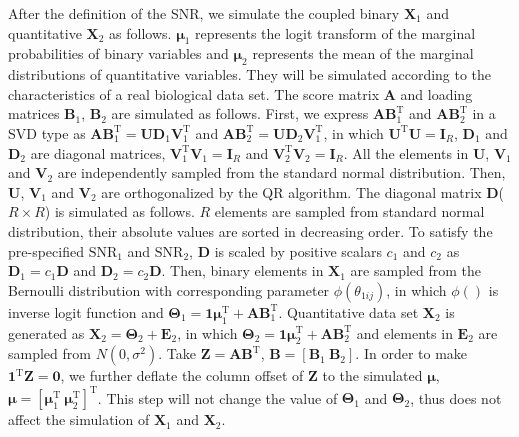 After the definition of the SNR, we simulate the coupled binary $\mathbf{X}_1$ and quantitative $\mathbf{X}_2$ as follows. $\bm{\mu}_1$ represents the logit transform of the marginal probabilities of binary variables and $\bm{\mu}_2$ represents the mean of the marginal distributions of quantitative variables. They will be simulated according to the characteristics of a real biological data set. The score matrix $\mathbf{A}$ and loading matrices $\mathbf{B}_1$, $\mathbf{B}_2$ are simulated as follows. First, we express $\mathbf{A}\mathbf{B}_1^{\text{T}}$ and $\mathbf{A}\mathbf{B}_2^{\text{T}}$ in a SVD type as $\mathbf{A}\mathbf{B}_1^{\text{T}} = \mathbf{U}\mathbf{D}_1\mathbf{V}_1^{\text{T}}$ and $\mathbf{A}\mathbf{B}_2^{\text{T}} = \mathbf{U}\mathbf{D}_2\mathbf{V}_1^{\text{T}}$, in which $\mathbf{U}^{\text{T}}\mathbf{U} = \mathbf{I}_R$, $\mathbf{D}_1$ and $\mathbf{D}_2$ are diagonal matrices, $\mathbf{V}_1^{\text{T}}\mathbf{V}_1 = \mathbf{I}_R$ and $\mathbf{V}_2^{\text{T}}\mathbf{V}_2 = \mathbf{I}_R$. All the elements in $\mathbf{U}$, $\mathbf{V}_1$ and $\mathbf{V}_2$ are independently sampled from the standard normal distribution. Then, $\mathbf{U}$, $\mathbf{V}_1$ and $\mathbf{V}_2$ are orthogonalized by the QR algorithm. The diagonal matrix $\mathbf{D}$($R\times R$) is simulated as follows. $R$ elements are sampled from standard normal distribution, their absolute values are sorted in decreasing order. To satisfy the pre-specified $\text{SNR}_1$ and $\text{SNR}_2$, $\mathbf{D}$ is scaled by positive scalars $c_1$ and $c_2$ as $\mathbf{D}_1 = c_1\mathbf{D}$ and $\mathbf{D}_2 = c_2\mathbf{D}$. Then, binary elements in $\mathbf{X}_1$ are sampled from the Bernoulli distribution with corresponding parameter $\phi(\theta_{1ij})$, in which $\phi()$ is inverse logit function and $\mathbf{\Theta}_1 = \mathbf{1}\bm{\mu}_1^{\text{T}} + \mathbf{AB}_1^{\text{T}}$. Quantitative data set $\mathbf{X}_2$ is generated as $\mathbf{X}_2 = \mathbf{\Theta}_2 + \mathbf{E}_2$, in which $\mathbf{\Theta}_2 = \mathbf{1}\bm{\mu}_2^{\text{T}} + \mathbf{AB}_2^{\text{T}}$ and elements in $\mathbf{E}_2$ are sampled from $N(0,\sigma^2)$. Take $\mathbf{Z} = \mathbf{A}\mathbf{B}^{\text{T}}$, $\mathbf{B} = [\mathbf{B}_1 ~ \mathbf{B}_2]$. In order to make $\mathbf{1}^{\text{T}}\mathbf{Z} = \mathbf{0}$, we further deflate the column offset of $\mathbf{Z}$ to the simulated $\bm{\mu}$, $\bm{\mu} = [\bm{\mu}_1^{\text{T}} ~ \bm{\mu}_2^{\text{T}}]^{\text{T}}$. This step will not change the value of $\mathbf{\Theta}_1$ and $\mathbf{\Theta}_2$, thus does not affect the simulation of $\mathbf{X}_1$ and $\mathbf{X}_2$.

